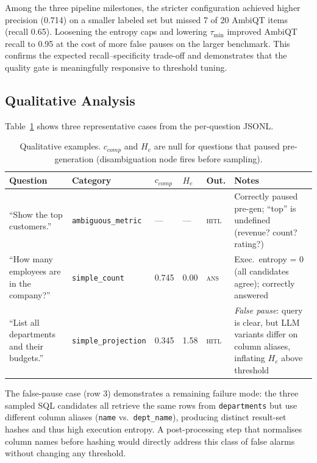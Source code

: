 \documentclass{article}
\begin{document}
Among the three pipeline milestones, the
stricter configuration achieved higher precision (0.714) on a smaller
labeled set but missed 7 of 20 AmbiQT items (recall 0.65).
Loosening the entropy caps and lowering $\tau_{\min}$ improved AmbiQT recall
to 0.95 at the cost of more false pauses on the larger benchmark.
This confirms the expected recall--specificity trade-off and demonstrates
that the quality gate is meaningfully responsive to threshold tuning.

\subsection{Qualitative Analysis}
\label{sec:qualitative}

Table~\ref{tab:examples} shows three representative cases from the
per-question JSONL.

\begin{table}[h]
\centering
\caption{Qualitative examples.  $c_{comp}$ and $H_e$ are null for questions
  that paused pre-generation (disambiguation node fires before sampling).}
\label{tab:examples}
\small
\begin{tabular}{p{3.6cm}p{1.9cm}p{0.85cm}p{0.85cm}p{0.65cm}p{3.2cm}}
\toprule
\textbf{Question} & \textbf{Category}
  & \textbf{$c_{comp}$} & \textbf{$H_e$} & \textbf{Out.} & \textbf{Notes} \\
\midrule
\rowcolor{tpgreen}
``Show the top customers.'' & \texttt{ambiguous\_metric}
  & — & — & \textsc{hitl}
  & Correctly paused pre-gen; ``top'' is undefined (revenue? count? rating?) \\
\midrule
\rowcolor{tnblue}
``How many employees are in the company?'' & \texttt{simple\_count}
  & 0.745 & 0.00 & \textsc{ans}
  & Exec.\ entropy = 0 (all candidates agree); correctly answered \\
\midrule
\rowcolor{fpred}
``List all departments and their budgets.'' & \texttt{simple\_projection}
  & 0.345 & 1.58 & \textsc{hitl}
  & \emph{False pause}: query is clear, but LLM variants differ on column
    aliases, inflating $H_e$ above threshold \\
\bottomrule
\end{tabular}
\end{table}

The false-pause case (row 3) demonstrates a remaining failure mode: the
three sampled SQL candidates all retrieve the same rows from
\texttt{departments} but use different column aliases (\texttt{name} vs.\
\texttt{dept\_name}), producing distinct result-set hashes and thus high
execution entropy.
A post-processing step that normalises column names before hashing would
directly address this class of false alarms without changing any threshold.
\end{document}
